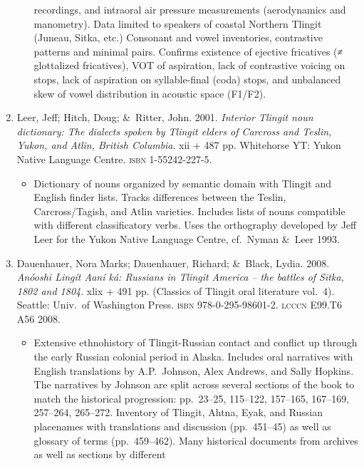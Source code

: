 \documentclass[12pt,letterpaper,oneside,article]{memoir}
\begin{document}
\begin{enumerate}
\begin{itemize}
		recordings, and intraoral air pressure measurements (aerodynamics and
		manometry).
		Data limited to speakers of coastal Northern Tlingit (Juneau, Sitka, etc.)
		Consonant and vowel inventories, contrastive patterns and minimal pairs.
		Confirms existence of ejective fricatives (≠ glottalized fricatives),
		VOT of aspiration, lack of contrastive voicing on stops, lack of aspiration
		on syllable-final (coda) stops, and unbalanced skew of vowel distribution in
		acoustic space (F1/F2).
	\end{itemize}
\item	Leer, Jeff; Hitch, Doug; \&\ Ritter, John.
	2001.
	\textit{Interior Tlingit noun dictionary: The dialects spoken by Tlingit elders
		of Carcross and Teslin, Yukon, and Atlin, British Columbia}.
	xii + 487 pp.
	Whitehorse YT: Yukon Native Language Centre.
	\textsc{isbn} 1-55242-227-5.
	\begin{itemize}
	\item	Dictionary of nouns organized by semantic domain with Tlingit and English
		finder lists.
		Tracks differences between the Teslin, Carcross/Tagish, and Atlin varieties.
		Includes lists of nouns compatible with different classificatory verbs.
		Uses the orthography developed by Jeff Leer for the Yukon Native Language
		Centre, cf.\ Nyman \&\ Leer 1993.
	\end{itemize}
\item	Dauenhauer, Nora Marks; Dauenhauer, Richard; \&\ Black, Lydia.
	2008.
	\textit{Anóoshi Lingít Aaní ká: Russians in Tlingit America
		– the battles of Sitka, 1802 and 1804}.
	xlix + 491 pp.
	(Classics of Tlingit oral literature vol.\ 4).
	Seattle: Univ.\ of Washington Press.
	\textsc{isbn} 978-0-295-98601-2.
	\textsc{lcccn} E99.T6 A56 2008.
	\begin{itemize}
	\item	Extensive ethnohistory of Tlingit-Russian contact and conflict up through
		the early Russian colonial period in Alaska.
		Includes oral narratives with English translations by
		 A.P.\ Johnson,  Alex Andrews,
		and  Sally Hopkins.
		The narratives by Johnson are split across several sections of the book to
		match the historical progression:
		pp.\ 23–25, 115–122, 157–165, 167–169, 257–264, 265–272.
		Inventory of Tlingit, Ahtna, Eyak, and Russian placenames with translations
		and discussion (pp.\ 451–45) as well as glossary of terms (pp.\ 459–462).
		Many historical documents from archives as well as sections by different

\end{itemize}
\end{enumerate}
\end{document}
